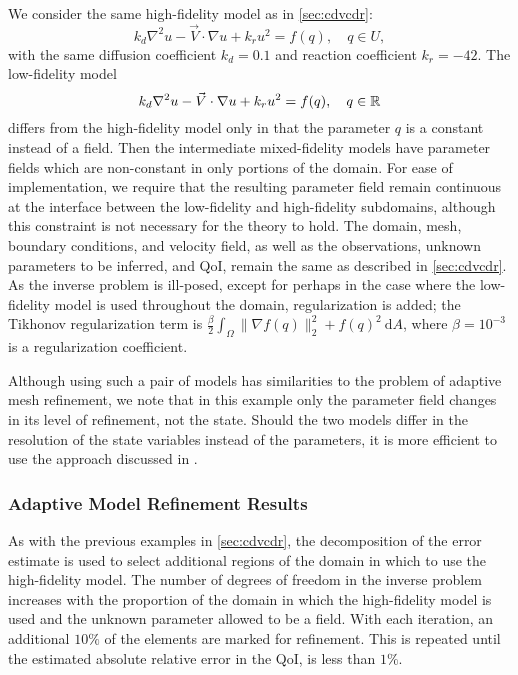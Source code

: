We consider the same high-fidelity model as in \cref{sec:cdvcdr}:
\begin{equation}
k_d\nabla^2 u - \vec{V}\cdot\nabla u + k_ru^2= f(q),\quad q\in U,
\end{equation}
with the same diffusion coefficient $k_d = 0.1$  and reaction coefficient $k_r = -42$. The low-fidelity model
\begin{equation}
k_d\nabla^2 u - \vec{V}\cdot\nabla u + k_ru^2= f(q),\quad q\in{\mathbb{R}}
\end{equation}
differs from the high-fidelity model only in that the parameter $q$ is a constant instead of a field. Then the intermediate mixed-fidelity models have parameter fields which are non-constant in only portions of the domain. For ease of implementation, we require that the resulting parameter field remain continuous at the interface between the low-fidelity and high-fidelity subdomains, although this constraint is not necessary for the theory to hold. The domain, mesh, boundary conditions, and velocity field, as well as the observations, unknown parameters to be inferred, and QoI, remain the same as described in \cref{sec:cdvcdr}. As the inverse problem is ill-posed, except for perhaps in the case where the low-fidelity model is used throughout the domain, regularization is added; the Tikhonov regularization term is $\frac{\beta}{2}\int_\Omega \|\nabla f(q)\|_2^2+f(q)^2\:\textrm{d}A$, where $\beta=10^{-3}$ is a regularization coefficient.

Although using such a pair of models has similarities to the problem of adaptive mesh refinement, we note that in this example only the parameter field changes in its level of refinement, not the state. Should the two models differ in the resolution of the state variables instead of the parameters, it is more efficient to use the approach discussed in \cite{BecVex05}.

\subsubsection{Adaptive Model Refinement Results}

As with the previous examples in \cref{sec:cdvcdr}, the decomposition of the error estimate is used to select additional regions of the domain in which to use the high-fidelity model. The number of degrees of freedom in the inverse problem increases with the proportion of the domain in which the high-fidelity model is used and the unknown parameter allowed to be a field. With each iteration, an additional $10\%$ of the elements are marked for refinement. This is repeated until the estimated absolute relative error in the QoI, is less than $1\%$.

